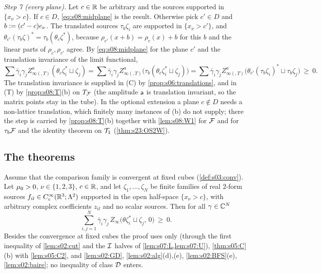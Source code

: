 \emph{Step 7 (every plane).} Let $c\in\mathbb R$ be arbitrary and the sources supported in $\{x_\nu>c\}$. If $c\in D$, \eqref{eq:s08:midplane} is the result. Otherwise pick $c'\in D$ and $b:=(c'-c)e_\nu$. The translated sources $\tau_b\zeta_i$ are supported in $\{x_\nu>c'\}$, and $\theta_{c'}(\tau_b\zeta)^*=\tau_b(\theta_c\zeta^*)$, because $\rho_{c'}(x+b)=\rho_c(x)+b$ for this $b$ and the linear parts of $\rho_c,\rho_{c'}$ agree. By \eqref{eq:s08:midplane} for the plane $c'$ and the translation invariance of the limit functional,
\[
\sum\bar\gamma_i\gamma_jZ^a_{\infty(,T)}(\theta_c\zeta_i^*\sqcup\zeta_j)=\sum\bar\gamma_i\gamma_jZ^a_{\infty(,T)}\big(\tau_b(\theta_c\zeta_i^*\sqcup\zeta_j)\big)=\sum\bar\gamma_i\gamma_jZ^a_{\infty(,T)}\big(\theta_{c'}(\tau_b\zeta_i)^*\sqcup\tau_b\zeta_j\big)\ \ge\ 0 .
\]
The translation invariance is supplied in (C) by \cref{prop:s06:translations}, and in (T) by \cref{prop:s08:T}(b) on $T_{\mathcal F}$ (the amplitude $\mathsf a$ is translation invariant, so the matrix points stay in the tube). In the optional extension a plane $c\notin D$ needs a non-lattice translation, which finitely many instances of \Wtwo(b) do not supply; there the step is carried by \cref{prop:s08:T}(b) together with \cref{lem:s08:W1} for $\mathcal F$ and for $\tau_b\mathcal F$ and the identity theorem on $\mathcal T_1$ (\cref{thm:s23:OS2W}).

\subsection{The theorems}

\begin{theorem}\label{thm:s08:OS2C}
Assume that the comparison family is convergent at fixed cubes (\cref{def:s03:conv}). Let $\mu_0>0$, $\nu\in\{1,2,3\}$, $c\in\mathbb R$, and let $\zeta_1,\dots,\zeta_N$ be finite families of real $2$-form sources $f_{il}\in C^\infty_c(\mathbb R^3;\Lambda^2)$ supported in the open half-space $\{x_\nu>c\}$, with arbitrary complex coefficients $z_{il}$ and no scalar sources. Then for all $\gamma\in\mathbb C^N$
\[
\sum_{i,j=1}^N\bar\gamma_i\gamma_j\,Z_\infty\big(\theta\zeta_i^*\sqcup\zeta_j,\,0\big)\ \ge\ 0 .
\]
Besides the convergence at fixed cubes the proof uses only \cite[Thm.~6.2(1),(2)]{BFS1} (through the first inequality of \cref{lem:s02:cut} and the $\mathcal I$ halves of \cref{lem:s07:L,lem:s07:U}), \cref{thm:s05:C}(b) with \cref{lem:s05:C2}, and \cref{lem:s02:GD}, \cref{lem:s02:alg}(d),(e), \cref{lem:s02:BFS}(e), \cref{lem:s02:baire}; no inequality of class $\mathcal D$ enters.
\end{theorem}

